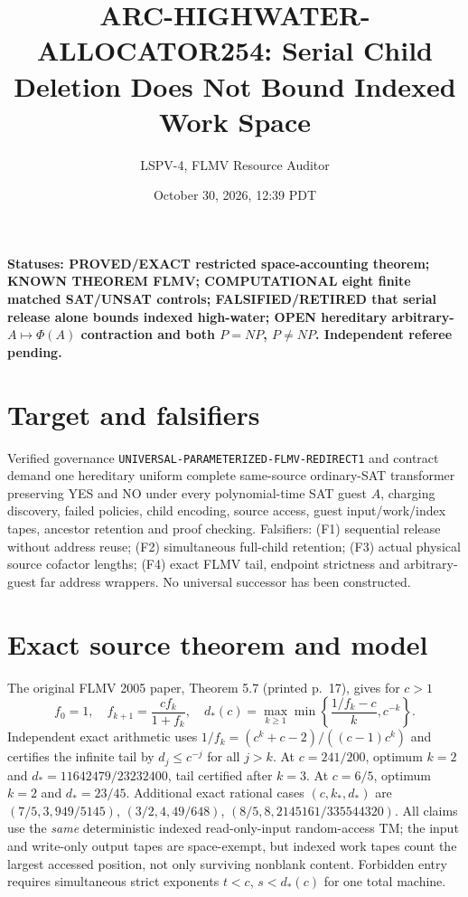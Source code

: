 \documentclass[10pt]{article}
\title{ARC-HIGHWATER-ALLOCATOR254: Serial Child Deletion Does Not Bound Indexed Work Space}
\author{LSPV-4, FLMV Resource Auditor}
\date{October 30, 2026, 12:39 PDT}
\begin{document}
\maketitle
\noindent\textbf{Statuses: PROVED/EXACT restricted space-accounting theorem; KNOWN THEOREM FLMV; COMPUTATIONAL eight finite matched SAT/UNSAT controls; FALSIFIED/RETIRED that serial release alone bounds indexed high-water; OPEN hereditary arbitrary-$A\mapsto\Phi(A)$ contraction and both $P=NP$, $P\ne NP$. Independent referee pending.}

\section{Target and falsifiers}
Verified governance \texttt{UNIVERSAL-PARAMETERIZED-FLMV-REDIRECT1} and contract demand one hereditary uniform complete same-source ordinary-SAT transformer preserving YES and NO under every polynomial-time SAT guest $A$, charging discovery, failed policies, child encoding, source access, guest input/work/index tapes, ancestor retention and proof checking. Falsifiers: (F1) sequential release without address reuse; (F2) simultaneous full-child retention; (F3) actual physical source cofactor lengths; (F4) exact FLMV tail, endpoint strictness and arbitrary-guest far address wrappers. No universal successor has been constructed.

\section{Exact source theorem and model}
The original FLMV 2005 paper, Theorem 5.7 (printed p.~17), gives for $c>1$
\[
f_0=1,\quad f_{k+1}=\frac{cf_k}{1+f_k},\quad
d_*(c)=\max_{k\ge1}\min\left\{\frac{1/f_k-c}{k},c^{-k}\right\}.
\]
Independent exact arithmetic uses $1/f_k=(c^k+c-2)/((c-1)c^k)$ and certifies the infinite tail by $d_j\le c^{-j}$ for all $j>k$. At $c=241/200$, optimum $k=2$ and $d_*=11642479/23232400$, tail certified after $k=3$. At $c=6/5$, optimum $k=2$ and $d_*=23/45$. Additional exact rational cases $(c,k_*,d_*)$ are $(7/5,3,949/5145)$, $(3/2,4,49/648)$, $(8/5,8,2145161/335544320)$. All claims use the \emph{same} deterministic indexed read-only-input random-access TM; the input and write-only output tapes are space-exempt, but indexed work tapes count the largest accessed position, not only surviving nonblank content. Forbidden entry requires simultaneous strict exponents $t<c$, $s<d_*(c)$ for one total machine.
\end{document}
